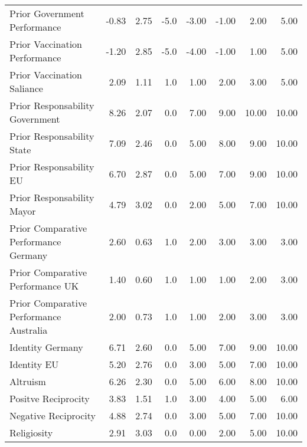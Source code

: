 \documentclass[12pt,oneside,smallheadings,chapterprefix=true]{article}
\begin{document}
\begin{table}
{\begin{tabular}[t]{lrrrrrrr}
Prior Government Performance & -0.83 & 2.75 & -5.0 & -3.00 & -1.00 & 2.00 & 5.00\\
Prior Vaccination Performance & -1.20 & 2.85 & -5.0 & -4.00 & -1.00 & 1.00 & 5.00\\
Prior Vaccination Saliance & 2.09 & 1.11 & 1.0 & 1.00 & 2.00 & 3.00 & 5.00\\
Prior Responsability Government & 8.26 & 2.07 & 0.0 & 7.00 & 9.00 & 10.00 & 10.00\\
Prior Responsability State & 7.09 & 2.46 & 0.0 & 5.00 & 8.00 & 9.00 & 10.00\\
Prior Responsability EU & 6.70 & 2.87 & 0.0 & 5.00 & 7.00 & 9.00 & 10.00\\
Prior Responsability Mayor & 4.79 & 3.02 & 0.0 & 2.00 & 5.00 & 7.00 & 10.00\\
Prior Comparative Performance Germany & 2.60 & 0.63 & 1.0 & 2.00 & 3.00 & 3.00 & 3.00\\
Prior Comparative Performance UK & 1.40 & 0.60 & 1.0 & 1.00 & 1.00 & 2.00 & 3.00\\
Prior Comparative Performance Australia & 2.00 & 0.73 & 1.0 & 1.00 & 2.00 & 3.00 & 3.00\\
Identity Germany & 6.71 & 2.60 & 0.0 & 5.00 & 7.00 & 9.00 & 10.00\\
Identity EU & 5.20 & 2.76 & 0.0 & 3.00 & 5.00 & 7.00 & 10.00\\
Altruism & 6.26 & 2.30 & 0.0 & 5.00 & 6.00 & 8.00 & 10.00\\
Positve Reciprocity & 3.83 & 1.51 & 1.0 & 3.00 & 4.00 & 5.00 & 6.00\\
Negative Reciprocity & 4.88 & 2.74 & 0.0 & 3.00 & 5.00 & 7.00 & 10.00\\
Religiosity & 2.91 & 3.03 & 0.0 & 0.00 & 2.00 & 5.00 & 10.00\\
\bottomrule
\end{tabular}}
\end{table}


\end{document}
